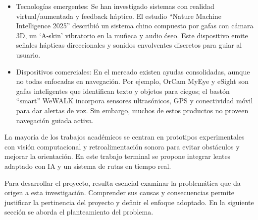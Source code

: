 \begin{itemize}
    \item Tecnologías emergentes: Se han investigado sistemas con realidad virtual/aumentada y feedback háptico. El estudio “Nature Machine Intelligence 2025” describió un sistema chino compuesto por gafas con cámara 3D, un ‘A-skin’ vibratorio en la muñeca y audio óseo. Este dispositivo emite señales hápticas direccionales y sonidos envolventes discretos para guiar al usuario. \cite{Bordonaba2025_navegador}

    \item Dispositivos comerciales: En el mercado existen ayudas consolidadas, aunque no todas enfocadas en navegación. Por ejemplo, OrCam MyEye y eSight son gafas inteligentes que identifican texto y objetos para ciegos; el bastón “smart” WeWALK incorpora sensores ultrasónicos, GPS y conectividad móvil para dar alertas de voz. Sin embargo, muchos de estos productos no proveen navegación guiada activa.
\end{itemize}

La mayoría de los trabajos académicos se centran en prototipos experimentales con visión computacional y retroalimentación sonora para evitar obstáculos y mejorar la orientación. En este trabajo terminal se propone integrar lentes adaptado con IA y un sistema de rutas en tiempo real. 

Para desarrollar el proyecto, resulta esencial examinar la problemática que da origen a esta investigación. Comprender sus causas y consecuencias permite justificar la pertinencia del proyecto y definir el enfoque adoptado. En la siguiente sección se aborda el planteamiento del problema.